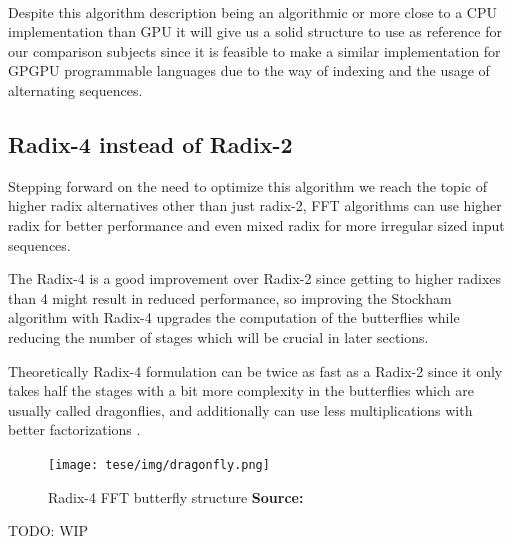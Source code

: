 \documentclass[
  oneside,
  11pt, a4paper,
  footinclude=true,
  headinclude=true,
  cleardoublepage=empty
]{scrbook}
\newcommand*{\source}[1]{%
    \textbf{Source:} \cite{#1}%
}
\begin{document}
\paragraph{}
Despite this algorithm description being an algorithmic or more close to a CPU implementation than GPU it will give us a solid structure to use as reference for our comparison subjects since it is feasible to make a similar implementation for GPGPU programmable languages due to the way of indexing and the usage of alternating sequences.

\subsection{Radix-4 instead of Radix-2}

Stepping forward on the need to optimize this algorithm we reach the topic of higher radix alternatives other than just radix-2, FFT algorithms can use higher radix for better performance and even mixed radix \cite{singleton1969algorithm} for more irregular sized input sequences.

The Radix-4 is a good improvement over Radix-2 since getting to higher radixes than 4 might result in reduced performance, so improving the Stockham algorithm with Radix-4 upgrades the computation of the butterflies while reducing the number of stages which will be crucial in later sections.

Theoretically Radix-4 formulation can be twice as fast as a Radix-2 \cite{hussain2010evaluation} since it only takes half the stages with a bit more complexity in the butterflies which are usually called dragonflies, and additionally can use less multiplications with better factorizations \cite{marti2009radix}.


\begin{figure}[h] 
    \centering
    \texttt{[image: tese/img/dragonfly.png]}
    \caption{Radix-4 FFT butterfly structure \source{marti2009radix}}
    \label{fig:radix4-dragonfly}
\end{figure}


TODO: WIP
\end{document}
